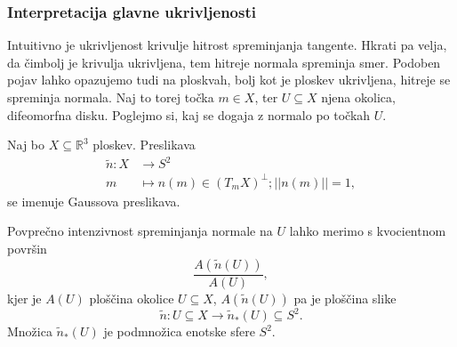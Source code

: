 \subsubsection{Interpretacija glavne ukrivljenosti}

Intuitivno je ukrivljenost krivulje hitrost spreminjanja tangente. Hkrati pa velja, da čimbolj je krivulja ukrivljena, tem hitreje
normala spreminja smer. Podoben pojav lahko opazujemo tudi na ploskvah, bolj kot je ploskev ukrivljena, hitreje se spreminja normala.
Naj to torej točka $m \in  X$, ter $U \subseteq X$ njena okolica, difeomorfna disku. Poglejmo si, kaj se dogaja z normalo po točkah $U$.

\begin{definicija}
\label{def_gaussova_preslikava}
Naj bo $X \subseteq  \mathbb{R}^3$ ploskev. Preslikava \begin{align*}
  \tilde{n}: X &\longrightarrow S^{2} \\
  m &\longmapsto n(m) \in  (T_mX)^{\perp}; \lvert\lvert n(m) \rvert\rvert = 1,   
\end{align*}se imenuje Gaussova preslikava.
\end{definicija}

Povprečno intenzivnost spreminjanja normale na $U$ lahko merimo s kvocientnom površin \begin{equation*}
\frac{A(\tilde{n}(U))}{A(U)},
\end{equation*}  
kjer je $A(U)$ ploščina okolice $U \subseteq X$, $A(\tilde{n}(U))$ pa je ploščina slike \begin{equation*}
\tilde{n}: U \subseteq X \to \tilde{n}_{*}(U) \subseteq S^2. 
\end{equation*}  
Množica $\tilde{n}_{*}(U)$ je podmnožica enotske sfere $S^2$.

